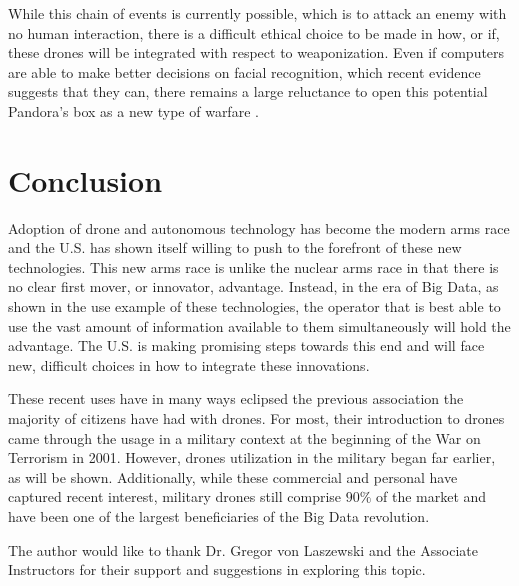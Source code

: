 \documentclass[sigconf]{acmart}
\begin{document}
While this chain of events is currently possible, which is to attack an enemy with no human interaction, there is a difficult ethical choice to be made in how, or if, these drones will be integrated with respect to weaponization. Even if computers are able to make better decisions on facial recognition, which recent evidence suggests that they can, there remains a large reluctance to open this potential Pandora's box as a new type of warfare \cite{googleface}. 

\section{Conclusion}
Adoption of drone and autonomous technology has become the modern arms race and the U.S. has shown itself willing to push to the forefront of these new technologies. This new arms race is unlike the nuclear arms race in that there is no clear first mover, or innovator, advantage. Instead, in the era of Big Data, as shown in the use example of these technologies, the operator that is best able to use the vast amount of information available to them simultaneously will hold the advantage. The U.S. is making promising steps towards this end and will face new, difficult choices in how to integrate these innovations.


 
 
 

These recent uses have in many ways eclipsed the previous association the majority of citizens have had with drones. For most, their introduction to drones came through the usage in a military context at the beginning of the War on Terrorism in 2001. However, drones utilization in the military began far earlier, as will be shown. Additionally, while these commercial and personal have captured recent interest, military drones still comprise $90\%$ of the market and have been one of the largest beneficiaries of the Big Data revolution.


\begin{acks}
The author would like to thank Dr. Gregor von Laszewski and the Associate Instructors for their support and suggestions in exploring this topic.
\end{acks}


 

%
\end{document}
